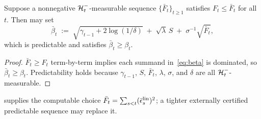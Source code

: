 \begin{corollary}\label{cor:beta-constructive}
Suppose a nonnegative $\mathcal{H}_t^-$-measurable sequence
$\{\bar F_t\}_{t\ge 1}$
satisfies $F_t \le \bar F_t$ for all~$t$.
Then  may set
\[
  \bar\beta_t \;:=\;
  \sqrt{\gamma_{t-1} + 2\log(1/\delta)}
  \;+\; \sqrt{\lambda}\,S
  \;+\; \sigma^{-1}\sqrt{\bar F_t},
\]
which is predictable and satisfies $\bar\beta_t \ge \beta_t$.
\end{corollary}
\begin{proof}
$\bar F_t \ge F_t$ term-by-term implies each summand in~\eqref{eq:beta}
is dominated, so $\bar\beta_t \ge \beta_t$.
Predictability holds because $\gamma_{t-1}$, $S$, $\bar F_t$, $\lambda$,
$\sigma$, and $\delta$ are all $\mathcal{H}_t^-$-measurable.
\end{proof}

\noindent
{} supplies the computable choice
$\bar F_t=\sum_{s<t}(\bar\epsilon_s^{\rm lin})^2$; a tighter externally
certified predictable sequence may replace it.

